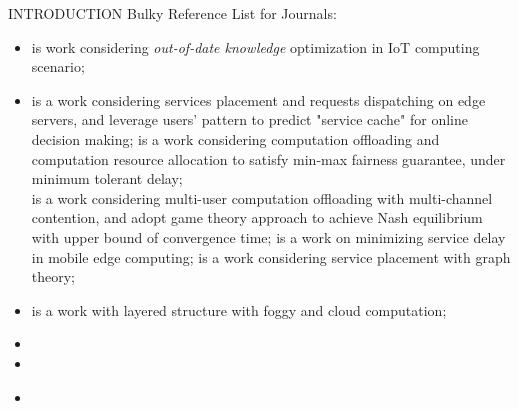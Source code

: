 \documentclass[10pt, conference, letterpaper]{IEEEtran}
\begin{document}
\begin{section}{INTRODUCTION}
        Bulky Reference List for Journals:
        \begin{itemize}
            \item {} \cite{Lyu2017} is work considering \emph{out-of-date knowledge} optimization in IoT computing scenario;
            \item
                \cite{Yang2016} is a work considering services placement and requests dispatching on edge servers, and leverage users' pattern to predict "service cache" for online decision making;
                \cite{Du2018} is a work considering computation offloading and computation resource allocation to satisfy min-max fairness guarantee, under minimum tolerant delay;
                \\
                \cite{Chen2016} is a work considering multi-user computation offloading with multi-channel contention, and adopt game theory approach to achieve Nash equilibrium with upper bound of convergence time;
                \cite{Rodrigues2017} is a work on minimizing service delay in mobile edge computing;
                \cite{Wang2017} is a work considering service placement with graph theory;
            \item \text{[foggy]}
                \cite{Masip-Bruin2016} is a work with layered structure with foggy and cloud computation;
            \item {}
            
            \item \text{[Survey]}
            
            \item \text{[unfinished]}
                \cite{Fan2017}
        \end{itemize}

    \end{section}
\end{document}

